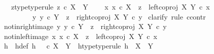 \begin{isabellebody}
\ \ \ z{\isacharunderscore}{\kern0pt}type{\isacharbrackleft}{\kern0pt}type{\isacharunderscore}{\kern0pt}rule{\isacharbrackright}{\kern0pt}{\isacharcolon}{\kern0pt}\ {\isachardoublequoteopen}z\ {\isasymin}\isactrlsub c\ X\ {\isasymCoprod}\ Y{\isachardoublequoteclose}\isanewline
\ \ \ {\isachardoublequoteopen}{\isacharparenleft}{\kern0pt}{\isasymexists}\ x{\isachardot}{\kern0pt}\ {\isacharparenleft}{\kern0pt}x\ {\isasymin}\isactrlsub c\ X\ {\isasymand}\ z\ {\isacharequal}{\kern0pt}\ {\isacharparenleft}{\kern0pt}left{\isacharunderscore}{\kern0pt}coproj\ X\ Y{\isacharparenright}{\kern0pt}\ {\isasymcirc}\isactrlsub c\ x{\isacharparenright}{\kern0pt}{\isacharparenright}{\kern0pt}\isanewline
\ \ \ \ \ \ {\isasymor}\ \ {\isacharparenleft}{\kern0pt}{\isasymexists}\ y{\isachardot}{\kern0pt}\ {\isacharparenleft}{\kern0pt}y\ {\isasymin}\isactrlsub c\ Y\ {\isasymand}\ z\ {\isacharequal}{\kern0pt}\ {\isacharparenleft}{\kern0pt}right{\isacharunderscore}{\kern0pt}coproj\ X\ Y{\isacharparenright}{\kern0pt}\ {\isasymcirc}\isactrlsub c\ y{\isacharparenright}{\kern0pt}{\isacharparenright}{\kern0pt}{\isachardoublequoteclose}\isanewline
%
\isadelimproof
%
\endisadelimproof
%
\isatagproof
{}\isamarkupfalse%
\ {\isacharparenleft}{\kern0pt}clarify{\isacharcomma}{\kern0pt}\ rule\ ccontr{\isacharparenright}{\kern0pt}\isanewline
\ \ \isamarkupfalse%
\ not{\isacharunderscore}{\kern0pt}in{\isacharunderscore}{\kern0pt}right{\isacharunderscore}{\kern0pt}image{\isacharcolon}{\kern0pt}\ {\isachardoublequoteopen}{\isasymnexists}y{\isachardot}{\kern0pt}\ y\ {\isasymin}\isactrlsub c\ Y\ {\isasymand}\ z\ {\isacharequal}{\kern0pt}\ right{\isacharunderscore}{\kern0pt}coproj\ X\ Y\ {\isasymcirc}\isactrlsub c\ y{\isachardoublequoteclose}\isanewline
\ \ \isamarkupfalse%
\ not{\isacharunderscore}{\kern0pt}in{\isacharunderscore}{\kern0pt}left{\isacharunderscore}{\kern0pt}image{\isacharcolon}{\kern0pt}\ {\isachardoublequoteopen}{\isasymnexists}x{\isachardot}{\kern0pt}\ x\ {\isasymin}\isactrlsub c\ X\ {\isasymand}\ z\ {\isacharequal}{\kern0pt}\ left{\isacharunderscore}{\kern0pt}coproj\ X\ Y\ {\isasymcirc}\isactrlsub c\ x{\isachardoublequoteclose}\isanewline
\ \ \isanewline
\ \ \isamarkupfalse%
\ h\ \ h{\isacharunderscore}{\kern0pt}def{\isacharcolon}{\kern0pt}\ {\isachardoublequoteopen}h\ {\isacharequal}{\kern0pt}\ {\isasymf}\ {\isasymcirc}\isactrlsub c\ {\isasymbeta}\isactrlbsub X\ {\isasymCoprod}\ Y\isactrlesub {\isachardoublequoteclose}\ \ h{\isacharunderscore}{\kern0pt}type{\isacharbrackleft}{\kern0pt}type{\isacharunderscore}{\kern0pt}rule{\isacharbrackright}{\kern0pt}{\isacharcolon}{\kern0pt}\ {\isachardoublequoteopen}h\ {\isacharcolon}{\kern0pt}\ X\ {\isasymCoprod}\ Y\ {\isasymrightarrow}\ {\isasymOmega}{\isachardoublequoteclose}\isanewline

\end{isabellebody}

